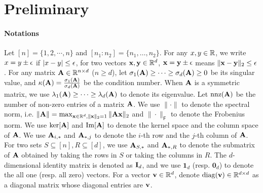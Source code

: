 \section{Preliminary}
\label{sec:formulation}


\paragraph{Notations}
Let $[n]=\{1,2,\cdots,n\}$ and $[n_1: n_2] = \{n_1, \ldots, n_2\}$. 
For any $x, y \in \mathbb{R}$, we write $x = y \pm \epsilon$ if $|x - y| \leq \epsilon$, for two vectors $\mathbf{x}, \mathbf{y} \in \mathbb{R}^d$, $\mathbf{x} = \mathbf{y} \pm \epsilon$ means $\|\mathbf{x} - \mathbf{y}\|_2 \leq \epsilon$.
For any matrix $\mathbf{A} \in \mathbb{R}^{n\times d}$ ($n \geq d$), let $\sigma_1(\mathbf{A})\geq \cdots \geq \sigma_d(\mathbf{A}) \geq 0$ be its singular value, and $\kappa(\mathbf{A}) = \frac{\sigma_1(\mathbf{A})}{\sigma_d(\mathbf{A})}$ be the condition number. When $\mathbf{A}$ is a symmetric matrix, we use $\lambda_1(\mathbf{A}) \geq \cdots \geq \lambda_d(\mathbf{A})$ to denote its eigenvalue.
Let $\operatorname{nnz}(\mathbf{A})$ be the number of non-zero entries of a matrix $\mathbf{A}$.
We use $\|\cdot\|$ to denote the spectral norm, i.e. $\|\mathbf{A}\| = \max_{\mathbf{x}\in \mathbb{R}^d, \|\mathbf{x}\|_2 =1}\|\mathbf{A} \mathbf{x}\|_2$ and $\|\cdot\|_{\mathsf{F}}$ to denote the Frobenius norm. We use $\ker[\mathbf{A}]$ and $\operatorname{Im}[\mathbf{A}]$ to denote the kernel space and the column space of $\mathbf{A}$. We use $\mathbf{A}_{i,*}$ and $\mathbf{A}_{*,j}$ to denote the $i$-th row and the $j$-th column of $\mathbf{A}$. For two sets $S \subseteq [n], R \subseteq [d]$, we use $\mathbf{A}_{S,*}$ and $\mathbf{A}_{*,R}$ to denote the submatrix of $\mathbf{A}$ obtained by taking the rows in $S$ or taking the columns in $R$.
The $d$-dimensional identity matrix is denoted as $\mathbf{I}_d$, and we use $\mathbf{1}_d$ (resp. $\mathbf{0}_d$) to denote the all one (resp. all zero) vectors. For a vector $\mathbf{v} \in \mathbb{R}^d$, denote $\operatorname{diag}(\mathbf{v}) \in \mathbb{R}^{d \times d}$ as a diagonal matrix whose diagonal entries are $\mathbf{v}$. 




